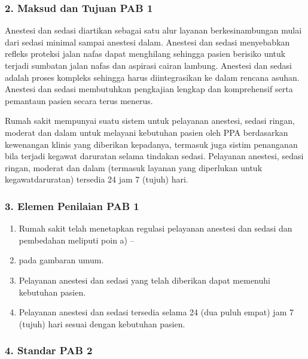 \documentclass[
]{book}
\providecommand{\tightlist}{%
  \setlength{\itemsep}{0pt}\setlength{\parskip}{0pt}}
\begin{document}
\hypertarget{maksud-dan-tujuan-pab-1}{%
\subsubsection*{2. Maksud dan Tujuan PAB 1}\label{maksud-dan-tujuan-pab-1}}

Anestesi dan sedasi diartikan sebagai satu alur layanan berkesinambungan mulai dari sedasi minimal sampai anestesi dalam. Anestesi dan sedasi menyebabkan refleks proteksi jalan nafas dapat menghilang sehingga pasien berisiko untuk terjadi sumbatan jalan nafas dan aspirasi cairan lambung. Anestesi dan sedasi adalah proses kompleks sehingga harus diintegrasikan ke dalam rencana asuhan. Anestesi dan sedasi membutuhkan pengkajian lengkap dan komprehensif serta pemantaun pasien secara terus menerus.

Rumah sakit mempunyai suatu sistem untuk pelayanan anestesi, sedasi ringan, moderat dan dalam untuk melayani kebutuhan pasien oleh PPA berdasarkan kewenangan klinis yang diberikan kepadanya, termasuk juga sistim penanganan bila terjadi kegawat daruratan selama tindakan sedasi. Pelayanan anestesi, sedasi ringan, moderat dan dalam (termasuk layanan yang diperlukan untuk kegawatdaruratan) tersedia 24 jam 7 (tujuh) hari.

\hypertarget{elemen-penilaian-pab-1}{%
\subsubsection*{3. Elemen Penilaian PAB 1}\label{elemen-penilaian-pab-1}}

\begin{enumerate}
\def\labelenumi{\alph{enumi}.}
\tightlist
\item
  Rumah sakit telah menetapkan regulasi pelayanan anestesi dan sedasi dan pembedahan meliputi poin a) --
\item
  pada gambaran umum.
\item
  Pelayanan anestesi dan sedasi yang telah diberikan dapat memenuhi kebutuhan pasien.
\item
  Pelayanan anestesi dan sedasi tersedia selama 24 (dua puluh empat) jam 7 (tujuh) hari sesuai dengan kebutuhan pasien.
\end{enumerate}

\hypertarget{standar-pab-2}{%
\subsubsection*{4. Standar PAB 2}\label{standar-pab-2}}
\end{document}
